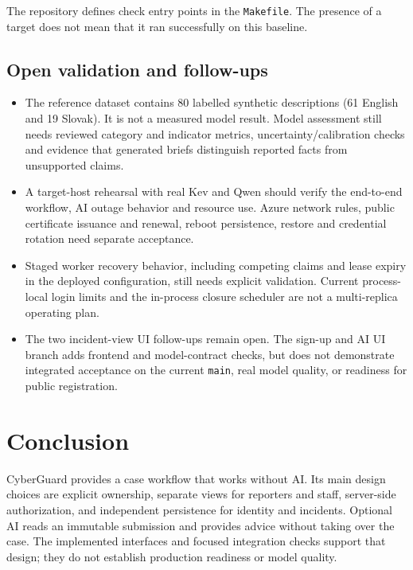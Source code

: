 \documentclass[11pt,a4paper]{article}
\newcommand{\code}[1]{\texttt{#1}}
\begin{document}
The repository defines check entry points in the \code{Makefile}.
The presence of a target does not mean
that it ran successfully on this baseline.

\subsection{Open validation and follow-ups}

\begin{itemize}
  \item The reference dataset contains 80 labelled synthetic descriptions
    (61 English and 19 Slovak). It is not a measured model result. Model
    assessment still needs reviewed category and indicator metrics,
    uncertainty/calibration checks and evidence that generated briefs
    distinguish reported facts from unsupported claims.
  \item A target-host rehearsal with real Kev and Qwen should verify the
    end-to-end workflow, AI outage behavior and resource use. Azure
    network rules, public certificate issuance and renewal, reboot
    persistence, restore and credential rotation need separate acceptance.
  \item Staged worker recovery behavior, including competing claims and
    lease expiry in the deployed configuration, still needs explicit
    validation. Current process-local login limits and the in-process
    closure scheduler are not a multi-replica operating plan.
  \item The two incident-view UI follow-ups remain open. The sign-up and AI
    UI branch adds frontend and model-contract checks, but does not demonstrate
    integrated acceptance on the current \code{main}, real model quality, or
    readiness for public registration.
\end{itemize}

\section{Conclusion}

CyberGuard provides a case workflow that works without AI. Its main design
choices are explicit ownership, separate views for reporters and staff,
server-side authorization, and independent persistence for identity and
incidents. Optional AI reads an immutable submission and provides advice
without taking over the case. The implemented interfaces and focused
integration checks support that design; they do not establish production
readiness or model quality.
\end{document}
